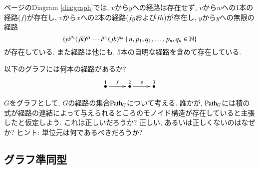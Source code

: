\begin{example}


\pageref{dia:graph}ページのDiagram \eqref{dia:graph}では, $v$から$y$への経路は存在せず, $v$から$w$への1本の経路($f$)が存在し, $v$から$x$への2本の経路($fg$および$fh$)が存在し, $y$から$y$への無限の経路$$\{y i^{p_1}(jk)^{q_1}\cdots i^{p_n}(jk)^{q_n}\;|\;n,p_1,q_1,\ldots,p_n,q_n\in{\mathbb N}\}$$が存在している. また経路は他にも, 5本の自明な経路を含めて存在している.

\end{example}

\begin{exercise}
以下のグラフには何本の経路があるか?
$$\xymatrix{\LMO{1}\ar[r]^{f}&\LMO{2}\ar[r]^{g}&\LMO{3}}$$
\end{exercise}

\begin{exercise}
$G$をグラフとして, $G$の経路の集合$\Path_G$について考える. 誰かが, $\Path_G$には積の式が経路の連結によって与えられるところのモノイド構造が存在していると主張したと仮定しよう. これは正しいだろうか? 正しい, あるいは正しくないのはなぜか? ヒント: 単位元は何であるべきだろうか?
\end{exercise}



\subsection{グラフ準同型}



